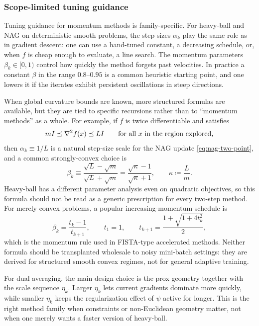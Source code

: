 \subsubsection{Scope-limited tuning guidance}
\label{subsubsec:momentum-tuning-stopping}

Tuning guidance for momentum methods is family-specific.
For heavy-ball and NAG on deterministic smooth problems, the step sizes $\alpha_k$ play the same role as in gradient descent: one can use a hand-tuned constant, a decreasing schedule, or, when $f$ is cheap enough to evaluate, a line search.
The momentum parameters $\beta_k\in[0,1)$ control how quickly the method forgets past velocities.
In practice a constant $\beta$ in the range $0.8$--$0.95$ is a common heuristic starting point, and one lowers it if the iterates exhibit persistent oscillations in steep directions.

When global curvature bounds are known, more structured formulas are available, but they are tied to specific recursions rather than to ``momentum methods'' as a whole.
For example, if $f$ is twice differentiable and satisfies
\[
  mI \preceq \nabla^2 f(x) \preceq LI
  \qquad \text{for all } x \text{ in the region explored,}
\]
then $\alpha_k\equiv 1/L$ is a natural step-size scale for the NAG update \eqref{eq:nag-two-point}, and a common strongly-convex choice is
\[
  \beta_k \equiv \frac{\sqrt{L}-\sqrt{m}}{\sqrt{L}+\sqrt{m}}
  = \frac{\sqrt{\kappa}-1}{\sqrt{\kappa}+1},
  \qquad \kappa \coloneqq \frac{L}{m}.
\]
Heavy-ball has a different parameter analysis even on quadratic objectives, so this formula should not be read as a generic prescription for every two-step method.
For merely convex problems, a popular increasing-momentum schedule is
\begin{equation}
  \beta_k = \frac{t_k-1}{t_{k+1}},
  \qquad
  t_1 = 1,
  \qquad
  t_{k+1} = \frac{1+\sqrt{1+4t_k^2}}{2},
  \label{eq:fista-momentum}
\end{equation}
which is the momentum rule used in FISTA-type accelerated methods.
Neither formula should be transplanted wholesale to noisy mini-batch settings: they are derived for structured smooth convex regimes, not for general adaptive training.

For dual averaging, the main design choice is the prox geometry together with the scale sequence $\eta_k$.
Larger $\eta_k$ lets current gradients dominate more quickly, while smaller $\eta_k$ keeps the regularization effect of $\psi$ active for longer.
This is the right method family when constraints or non-Euclidean geometry matter, not when one merely wants a faster version of heavy-ball.

